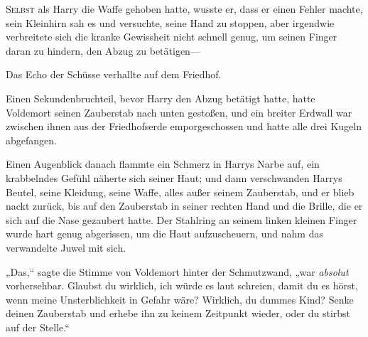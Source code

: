 
\lettrine{S}{elbst} als Harry die Waffe gehoben hatte, wusste er, dass er einen Fehler machte, sein Kleinhirn sah es und versuchte, seine Hand zu stoppen, aber irgendwie verbreitete sich die kranke Gewissheit nicht schnell genug, um seinen Finger daran zu hindern, den Abzug zu betätigen—

Das Echo der Schüsse verhallte auf dem Friedhof.

Einen Sekundenbruchteil, bevor Harry den Abzug betätigt hatte, hatte Voldemort seinen Zauberstab nach unten gestoßen, und ein breiter Erdwall war zwischen ihnen aus der Friedhofserde emporgeschossen und hatte alle drei Kugeln abgefangen.

Einen Augenblick danach flammte ein Schmerz in Harrys Narbe auf, ein krabbelndes Gefühl näherte sich seiner Haut; und dann verschwanden Harrys Beutel, seine Kleidung, seine Waffe, alles außer seinem Zauberstab, und er blieb nackt zurück, bis auf den Zauberstab in seiner rechten Hand und die Brille, die er sich auf die Nase gezaubert hatte. Der Stahlring an seinem linken kleinen Finger wurde hart genug abgerissen, um die Haut aufzuscheuern, und nahm das verwandelte Juwel mit sich.

„Das,“ sagte die Stimme von Voldemort hinter der Schmutzwand, „war \emph{absolut} vorhersehbar. Glaubst du wirklich, ich würde es laut schreien, damit du es hörst, wenn meine Unsterblichkeit in Gefahr wäre? Wirklich, du dummes Kind? Senke deinen Zauberstab und erhebe ihn zu keinem Zeitpunkt wieder, oder du stirbst auf der Stelle.“

